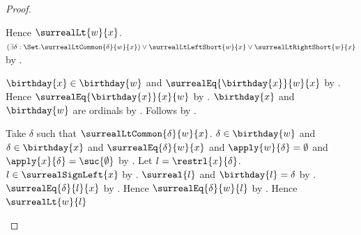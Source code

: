 \begin{proof}
\begin{byCase}
\begin{byCase}
                    Hence $\surrealLt{w}{x}$.
                    $(\exists\delta:\Set.
                            \surrealLtCommon{\delta}{w}{x})
                        \lor\surrealLtLeftShort{w}{x}
                        \lor\surrealLtRightShort{w}{x}$
                        by .
                    \begin{byCase}
                            $\birthday{x}\in\birthday{w}$ and
                                $\surrealEq{\birthday{x}}{w}{x}$
                                by .
                            Hence $\surrealEq{\birthday{x}}{x}{w}$
                                by .
                            $\birthday{x}$ and $\birthday{w}$ are ordinals
                                by .
                            Follows by .
                            \begin{byCase}
                                    Take $\delta$ such that
                                        $\surrealLtCommon{\delta}{w}{x}$.
                                    $\delta\in\birthday{w}$ and
                                        $\delta\in\birthday{x}$ and
                                        $\surrealEq{\delta}{w}{x}$ and
                                        $\apply{w}{\delta}=\emptyset$ and
                                        $\apply{x}{\delta}=\suc{\emptyset}$
                                        by .
                                    Let $l=\restrl{x}{\delta}$.
                                    $l\in\surrealSignLeft{x}$
                                        by .
                                    $\surreal{l}$ and $\birthday{l}=\delta$
                                        by .
                                    $\surrealEq{\delta}{l}{x}$
                                        by .
                                    Hence $\surrealEq{\delta}{w}{l}$
                                        by .
                                    Hence $\surrealLt{w}{l}$

\end{byCase}
\end{byCase}
\end{byCase}
\end{byCase}
\end{proof}
